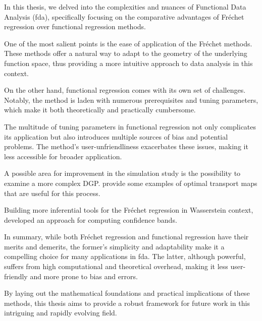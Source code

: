 In this thesis, we delved into the complexities and nuances of Functional Data
Analysis (fda), specifically focusing on the comparative advantages of Fréchet
regression over functional regression methods.

One of the most salient points is the ease of application of the Fréchet methods.
These methods offer a natural way to adapt to the geometry of the underlying function
space, thus providing a more intuitive approach to data analysis in this context.

On the other hand, functional regression comes with its own set of challenges. Notably,
the method is laden with numerous prerequisites and tuning parameters, which make it
both theoretically and practically cumbersome.

The multitude of tuning parameters in functional regression not only complicates its
application but also introduces multiple sources of bias and potential problems. The
method's user-unfriendliness exacerbates these issues, making it less accessible for
broader application.

A possible area for improvement in the simulation study is the possibility to examine
a more complex DGP. \textcite{panaretosAmplitudePhaseVariation2016} provide some
examples of optimal transport maps that are useful for this process.

Building more inferential tools for the Fréchet regression in Wasserstein context,
\textcite{PetersenLiuDivani2021} developed an approach for computing confidence bands.

In summary, while both Fréchet regression and functional regression have their merits
and demerits, the former's simplicity and adaptability make it a compelling choice for
many applications in fda. The latter, although powerful, suffers from high computational
and theoretical overhead, making it less user-friendly and more prone to bias and errors.

By laying out the mathematical foundations and practical implications of these methods,
this thesis aims to provide a robust framework for future work in this intriguing and
rapidly evolving field.

